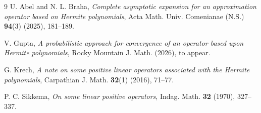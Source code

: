 \documentclass[11pt,a4paper]{article}
\begin{document}
\bigskip

%
%

\begin{thebibliography}{9}
U. Abel and N. L. Braha, 
\emph{Complete asymptotic expansion for an approximation operator based on Hermite polynomials}, 
Acta Math. Univ. Comenianae (N.S.) \textbf{94}(3) (2025), 181--189.

V. Gupta, 
\emph{A probabilistic approach for convergence of an operator based upon Hermite polynomials}, 
Rocky Mountain J. Math. (2026), to appear.

G. Krech, 
\emph{A note on some positive linear operators associated with the Hermite polynomials}, 
Carpathian J. Math. \textbf{32}(1) (2016), 71--77.

P. C. Sikkema, 
\emph{On some linear positive operators}, 
Indag. Math. \textbf{32} (1970), 327--337.
%
%
%
\end{thebibliography}
\end{document}
